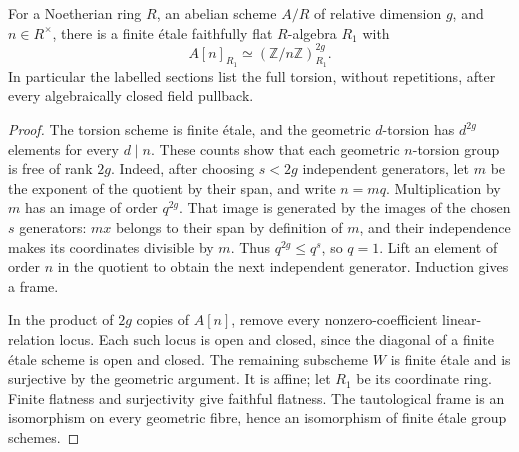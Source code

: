\begin{srlemma}
\label{lem:ftb-torsion-frame-cover}
For a Noetherian ring \(R\), an abelian scheme \(A/R\) of relative
dimension \(g\), and \(n\in R^\times\), there is a finite
\'{e}tale faithfully flat \(R\)-algebra \(R_1\) with
\[
             A[n]_{R_1}\simeq(\mathbb Z/n\mathbb Z)^{2g}_{R_1}.
\]
In particular the labelled sections list the full torsion,
without repetitions, after every algebraically closed field
pullback.
\end{srlemma}
\begin{proof}
The torsion scheme is finite \'{e}tale, and the geometric
\(d\)-torsion has \(d^{2g}\) elements for every \(d\mid n\).
These counts show that each geometric \(n\)-torsion group is
free of rank \(2g\).  Indeed, after choosing \(s<2g\) independent
generators, let \(m\) be the exponent of the quotient by their
span, and write \(n=mq\).  Multiplication by \(m\) has an image
of order \(q^{2g}\).  That image is generated by the images of
the chosen \(s\) generators: \(mx\) belongs to their span by
definition of \(m\), and their independence makes its
coordinates divisible by \(m\).
Thus \(q^{2g}\le q^s\), so \(q=1\).
Lift an element of order \(n\) in the quotient to obtain the
next independent generator.  Induction gives a frame.

In the product of \(2g\) copies of \(A[n]\), remove every
nonzero-coefficient linear-relation locus.  Each such locus
is open and closed, since the diagonal of a finite \'{e}tale
scheme is open and closed.  The remaining subscheme \(W\) is
finite \'{e}tale and is surjective by the geometric argument.
It is affine; let \(R_1\) be its coordinate ring.
Finite flatness and surjectivity give faithful flatness.
The tautological frame is an isomorphism on every geometric
fibre, hence an isomorphism of finite \'{e}tale group schemes.
\end{proof}

